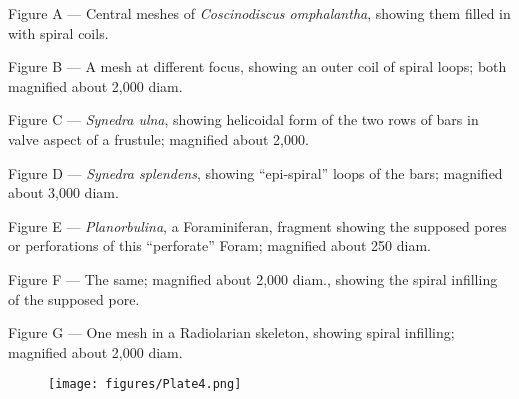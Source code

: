 \documentclass[a4paper, 12pt, oneside]{article}
\begin{document}
\begin{description}
\item Figure A --- Central meshes of \emph{Coscinodiscus omphalantha}, showing them filled in with spiral coils.
\item Figure B --- A mesh at different focus, showing an outer coil of spiral loops; both magnified about 2,000 diam.
\item Figure C --- \emph{Synedra ulna}, showing helicoidal form of the two rows of bars in valve aspect of a frustule; magnified about 2,000.
\item Figure D --- \emph{Synedra splendens}, showing ``epi-spiral'' loops of the bars; magnified about 3,000 diam.
\item Figure E --- \emph{Planorbulina}, a Foraminiferan, fragment showing the supposed pores or perforations of this ``perforate'' Foram; magnified about 250 diam.
\item Figure F --- The same; magnified about 2,000 diam., showing the spiral infilling of the supposed pore.
\item Figure G --- One mesh in a Radiolarian skeleton, showing spiral infilling; magnified about 2,000 diam.
\end{description}
\clearpage
\begin{figure}[b]
\centering
\texttt{[image: figures/Plate4.png]}
\caption{}
\end{figure}
\clearpage
\end{document}
